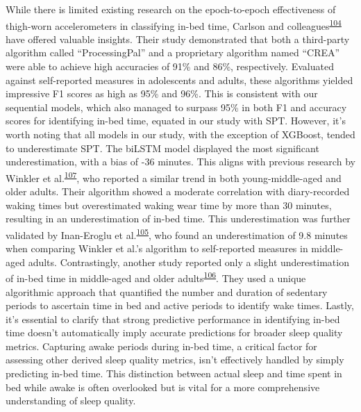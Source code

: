 \documentclass[
  10pt,
]{scrbook}
\begin{document}
While there is limited existing research on the epoch-to-epoch
effectiveness of thigh-worn accelerometers in classifying in-bed time,
Carlson and
colleagues\textsuperscript{\protect\hyperlink{ref-carlson_validity_2021}{104}}
have offered valuable insights. Their study demonstrated that both a
third-party algorithm called ``ProcessingPal'' and a proprietary
algorithm named ``CREA'' were able to achieve high accuracies of 91\%
and 86\%, respectively. Evaluated against self-reported measures in
adolescents and adults, these algorithms yielded impressive F1 scores as
high as 95\% and 96\%. This is consistent with our sequential models,
which also managed to surpass 95\% in both F1 and accuracy scores for
identifying in-bed time, equated in our study with SPT. However, it's
worth noting that all models in our study, with the exception of
XGBoost, tended to underestimate SPT. The biLSTM model displayed the
most significant underestimation, with a bias of -36 minutes. This
aligns with previous research by Winkler et
al.\textsuperscript{\protect\hyperlink{ref-winkler_identifying_2016}{107}},
who reported a similar trend in both young-middle-aged and older adults.
Their algorithm showed a moderate correlation with diary-recorded waking
times but overestimated waking wear time by more than 30 minutes,
resulting in an underestimation of in-bed time. This underestimation was
further validated by Inan-Eroglu et
al.\textsuperscript{\protect\hyperlink{ref-inan-eroglu_comparison_2021}{105}},
who found an underestimation of 9.8 minutes when comparing Winkler et
al.'s algorithm to self-reported measures in middle-aged adults.
Contrastingly, another study reported only a slight underestimation of
in-bed time in middle-aged and older
adults\textsuperscript{\protect\hyperlink{ref-van_der_berg_identifying_2016}{106}}.
They used a unique algorithmic approach that quantified the number and
duration of sedentary periods to ascertain time in bed and active
periods to identify wake times. Lastly, it's essential to clarify that
strong predictive performance in identifying in-bed time doesn't
automatically imply accurate predictions for broader sleep quality
metrics. Capturing awake periods during in-bed time, a critical factor
for assessing other derived sleep quality metrics, isn't effectively
handled by simply predicting in-bed time. This distinction between
actual sleep and time spent in bed while awake is often overlooked but
is vital for a more comprehensive understanding of sleep quality.
\end{document}
